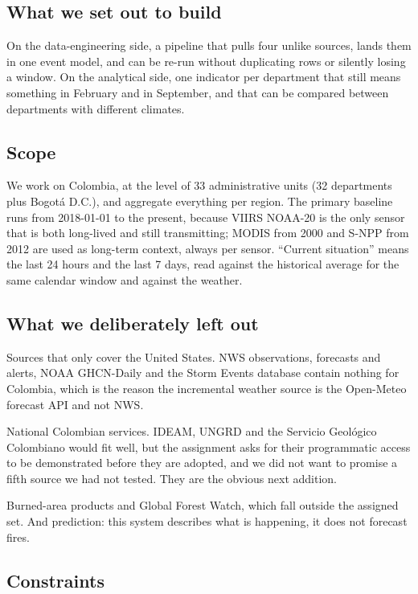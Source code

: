 \documentclass[11pt,a4paper]{article}
\begin{document}
\subsection{What we set out to build}

On the data-engineering side, a pipeline that pulls four unlike sources, lands them in one event
model, and can be re-run without duplicating rows or silently losing a window. On the analytical
side, one indicator per department that still means something in February and in September, and
that can be compared between departments with different climates.

\subsection{Scope}

We work on Colombia, at the level of 33 administrative units (32 departments plus Bogotá D.C.), and
aggregate everything per region. The primary baseline runs from 2018-01-01 to the present, because
VIIRS NOAA-20 is the only sensor that is both long-lived and still transmitting; MODIS from 2000 and
S-NPP from 2012 are used as long-term context, always per sensor. ``Current situation'' means the
last 24 hours and the last 7 days, read against the historical average for the same calendar window
and against the weather.

\subsection{What we deliberately left out}

Sources that only cover the United States. NWS observations, forecasts and alerts, NOAA GHCN-Daily
and the Storm Events database contain nothing for Colombia, which is the reason the incremental
weather source is the Open-Meteo forecast API and not NWS.

National Colombian services. IDEAM, UNGRD and the Servicio Geológico Colombiano would fit well, but
the assignment asks for their programmatic access to be demonstrated before they are adopted, and we
did not want to promise a fifth source we had not tested. They are the obvious next addition.

Burned-area products and Global Forest Watch, which fall outside the assigned set. And prediction:
this system describes what is happening, it does not forecast fires.

\subsection{Constraints}
\end{document}
